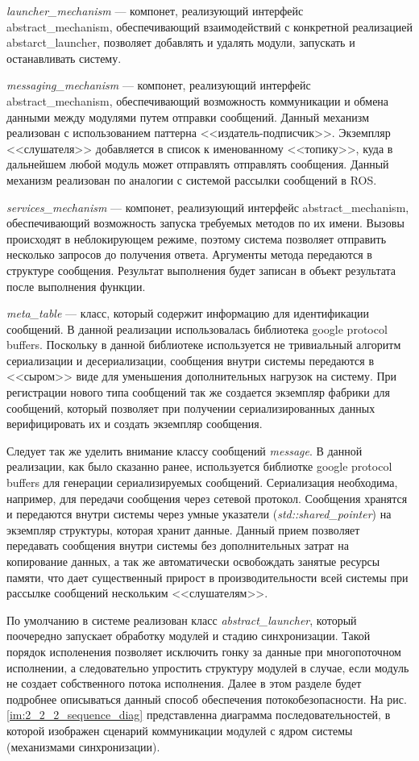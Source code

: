 \textit{launcher\_mechanism} --- компонет, реализующий интерфейс abstract\_mechanism, обеспечивающий взаимодействий с конкретной реализацией abstarct\_launcher, позволяет добавлять и удалять модули, запускать и останавливать систему.

\textit{messaging\_mechanism} --- компонет, реализующий интерфейс abstract\_mechanism, обеспечивающий возможность коммуникации и обмена данными между модулями путем отправки сообщений. Данный механизм реализован с использованием паттерна <<издатель-подписчик>>. Экземпляр <<слушателя>> добавляется в список к именованному <<топику>>, куда в дальнейшем любой модуль может отправлять отправлять сообщения. Данный механизм реализован по аналогии с системой рассылки сообщений в ROS.

\textit{services\_mechanism} --- компонет, реализующий интерфейс abstract\_mechanism, обеспечивающий возможность запуска требуемых методов по их имени. Вызовы происходят в неблокирующем режиме, поэтому система позволяет отправить несколько запросов до получения ответа. Аргументы метода передаются в структуре сообщения. Результат выполнения будет записан в объект результата после выполнения функции. 

\textit{meta\_table} --- класс, который содержит информацию для идентификации сообщений. В данной реализации использовалась библиотека google protocol buffers. Поскольку в данной библиотеке используется не тривиальный алгоритм сериализации и десериализации, сообщения внутри системы передаются в <<сыром>> виде для уменьшения дополнительных нагрузок на систему. При регистрации нового типа сообщений так же создается экземпляр фабрики для сообщений, который позволяет при получении сериализированных данных верифицировать их и создать экземпляр сообщения.

Следует так же уделить внимание классу сообщений \textit{message}. В данной реализации, как было сказанно ранее, используется библиотке google protocol buffers для генерации сериализируемых сообщений. Сериализация необходима, например, для передачи сообщения через сетевой протокол. Сообщения хранятся и передаются внутри системы через умные указатели (\textit{std::shared\_pointer}) на экземпляр структуры, которая хранит данные. Данный прием позволяет передавать сообщения внутри системы без дополнительных затрат на копирование данных, а так же автоматически освобождать занятые ресурсы памяти, что дает существенный прирост в производительности всей системы при рассылке сообщений нескольким <<слушателям>>.

По умолчанию в системе реализован класс \textit{abstract\_launcher}, который поочередно запускает обработку модулей и стадию синхронизации. Такой порядок исполенения позволяет исключить гонку за данные при многопоточном исполнении, а следовательно упростить структуру модулей в случае, если модуль не создает собственного потока исполнения. Далее в этом разделе будет подробнее описываться данный способ обеспечения потокобезопасности. На рис. \ref{im:2_2_2_sequence_diag} представленна диаграмма последовательностей, в которой изображен сценарий коммуникации модулей с ядром системы (механизмами синхронизации).

